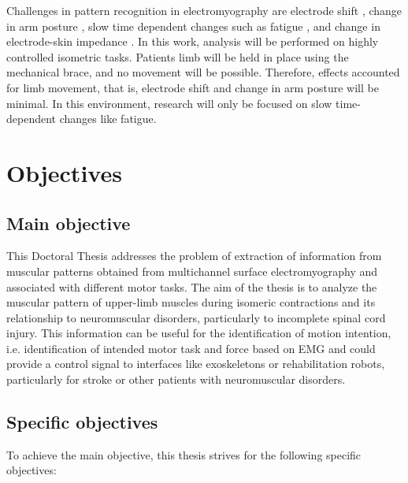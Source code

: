 Challenges in pattern recognition in electromyography are electrode shift \citep{Hargrove2008, Young2011}, change in arm posture \citep{Fougner2011}, slow time dependent changes \citep{Farina2014} such as fatigue \citep{Tkach2010}, and change in electrode-skin impedance \citep{Clancy2002a}. In this work, analysis will be performed on highly controlled isometric tasks. Patients limb will be held in place using the mechanical brace, and no movement will be possible. Therefore, effects accounted for limb movement, that is, electrode shift and change in arm posture will be minimal. In this environment, research will only be focused on slow time-dependent changes like fatigue. 


     \section{Objectives}
     
     	\subsection*{Main objective}

This Doctoral Thesis addresses the problem of extraction of information from muscular patterns obtained from multichannel surface electromyography and associated with different motor tasks. The aim of the thesis is to analyze the muscular pattern of upper-limb muscles during isomeric contractions and its relationship to neuromuscular disorders, particularly to incomplete spinal cord injury. This information can be useful for the identification of motion intention, i.e. identification of intended motor task and force based on EMG and could provide a control signal to interfaces like exoskeletons or rehabilitation robots, particularly for stroke or other patients with neuromuscular disorders.




        
        \subsection*{Specific objectives}
        
To achieve the main objective, this thesis strives for the following specific objectives:

